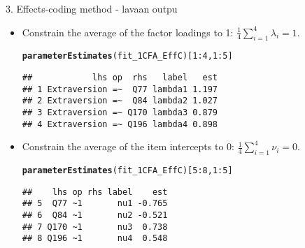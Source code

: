 \documentclass[10pt]{beamer}\usepackage[]{graphicx}\usepackage[]{xcolor}
\makeatletter
\newcommand{\hlnum}[1]{\textcolor[rgb]{0.686,0.059,0.569}{#1}}%
\newcommand{\hlopt}[1]{\textcolor[rgb]{0,0,0}{#1}}%
\newcommand{\hldef}[1]{\textcolor[rgb]{0.345,0.345,0.345}{#1}}%
\newcommand{\hlkwd}[1]{\textcolor[rgb]{0.737,0.353,0.396}{\textbf{#1}}}%
\newenvironment{kframe}{%
 \def\at@end@of@kframe{}%
 \ifinner\ifhmode%
  \def\at@end@of@kframe{\end{minipage}}%
  \begin{minipage}{\columnwidth}%
 \fi\fi%
 \def\FrameCommand##1{\hskip\@totalleftmargin \hskip-\fboxsep
 \colorbox{shadecolor}{##1}\hskip-\fboxsep
     \hskip-\linewidth \hskip-\@totalleftmargin \hskip\columnwidth}%
 \MakeFramed {\advance\hsize-\width
   \@totalleftmargin\z@ \linewidth\hsize
   \@setminipage}}%
 {\par\unskip\endMakeFramed%
 \at@end@of@kframe}
\newenvironment{knitrout}{}{} %
\makeatother
\begin{document}
\begin{frame}[fragile]{3. Effects-coding method - lavaan outpu}

\begin{itemize}
    \item Constrain the average of the factor loadings to 1:
    $\frac{1}{4} \sum_{i=1}^4 \lambda_i = 1$. \\ %
\begin{knitrout}
\color{fgcolor}\begin{kframe}
\begin{alltt}
\hlkwd{parameterEstimates}\hldef{(fit_1CFA_EffC)[}\hlnum{1}\hlopt{:}\hlnum{4}\hldef{,}\hlnum{1}\hlopt{:}\hlnum{5}\hldef{]}
\end{alltt}
\begin{verbatim}
##            lhs op  rhs   label   est
## 1 Extraversion =~  Q77 lambda1 1.197
## 2 Extraversion =~  Q84 lambda2 1.027
## 3 Extraversion =~ Q170 lambda3 0.879
## 4 Extraversion =~ Q196 lambda4 0.898
\end{verbatim}
\end{kframe}
\end{knitrout}
    \item Constrain the average of the item intercepts to 0:
    $\frac{1}{4} \sum_{i=1}^4 \nu_i = 0$.\\
\begin{knitrout}
\color{fgcolor}\begin{kframe}
\begin{alltt}
\hlkwd{parameterEstimates}\hldef{(fit_1CFA_EffC)[}\hlnum{5}\hlopt{:}\hlnum{8}\hldef{,}\hlnum{1}\hlopt{:}\hlnum{5}\hldef{]}
\end{alltt}
\begin{verbatim}
##    lhs op rhs label    est
## 5  Q77 ~1       nu1 -0.765
## 6  Q84 ~1       nu2 -0.521
## 7 Q170 ~1       nu3  0.738
## 8 Q196 ~1       nu4  0.548
\end{verbatim}
\end{kframe}
\end{knitrout}
\end{itemize}

\end{frame}
%
\end{document}
